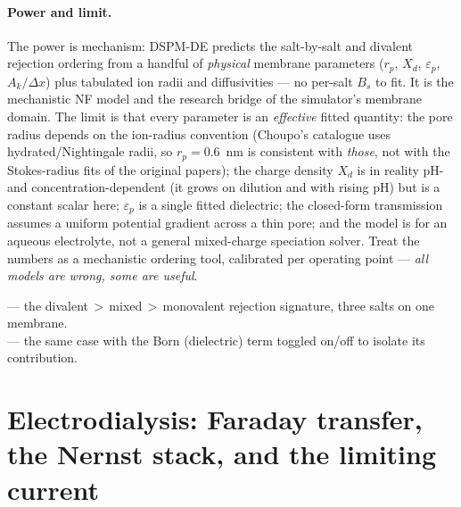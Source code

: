 \documentclass[11pt,a4paper]{article}
\begin{document}
\paragraph{Power and limit.}  The power is mechanism: DSPM-DE predicts
the salt-by-salt and divalent rejection ordering from a handful of
\emph{physical} membrane parameters ($r_p$, $X_d$, $\varepsilon_p$,
$A_k/\Delta x$) plus tabulated ion radii and diffusivities --- no
per-salt $B_s$ to fit.  It is the mechanistic NF model and the research
bridge of the simulator's membrane domain.  The limit is that every
parameter is an \emph{effective} fitted quantity: the pore radius
depends on the ion-radius convention (Choupo's catalogue uses
hydrated/Nightingale radii, so $r_p=0.6$~nm is consistent with
\emph{those}, not with the Stokes-radius fits of the original papers);
the charge density $X_d$ is in reality pH- and concentration-dependent
(it grows on dilution and with rising pH) but is a constant scalar here;
$\varepsilon_p$ is a single fitted dielectric; the closed-form
transmission assumes a uniform potential gradient across a thin pore;
and the model is for an aqueous electrolyte, not a general
mixed-charge speciation solver.  Treat the numbers as a mechanistic
ordering tool, calibrated per operating point --- \emph{all models are
wrong, some are useful}.

\begin{tutoriallink}
 --- the
divalent\,$>$\,mixed\,$>$\,monovalent rejection signature, three salts on
one membrane. \\
 ---
the same case with the Born (dielectric) term toggled on/off to isolate
its contribution.
\end{tutoriallink}

\section{Electrodialysis: Faraday transfer, the Nernst stack, and the
limiting current}\label{ch:electrodialysis}
\end{document}

